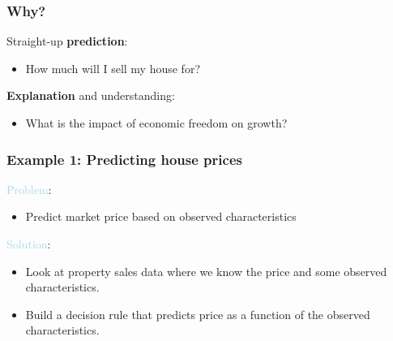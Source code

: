 \documentclass{beamer}
\newcommand{\bo}[1]{\textcolor{burntorange}{#1}}
\newcommand{\lb}[1]{\textcolor{lightblue}{#1}}
\newcommand{\bl}{\color{lightblue}}
\newcommand{\rd}{\color{burntorange}}
\newcommand{\bk}{\color{black}}
\newcommand{\bi}{\begin{itemize}}
\newcommand{\ib}{\end{itemize}}
\newcommand{\p}{\item}
\newcommand{\sk}{\vspace{.5cm}}
\begin{document}
%
%
%
\begin{frame}
\frametitle{Why?} \vspace{-0.5cm}


Straight-up \bo{ \bf prediction}:
\bi
\item How much will I sell my house for?
\ib
\sk
\sk 

\bo{ \bf Explanation} and understanding:
\bi
\item What is the impact of economic freedom on growth?
\ib

\end{frame}



\begin{frame}
\frametitle{Example 1: Predicting house prices} \vspace{-0.5cm}

{\lb {Problem}:}
\bi \p
Predict market price based on observed characteristics\ib
\sk
\sk

{\lb {Solution}:}
\bi \p Look at property sales data where we know the price and some observed characteristics.
\p Build a decision rule that predicts price as a function of the observed characteristics.
\ib

\end{frame}

\end{document}

